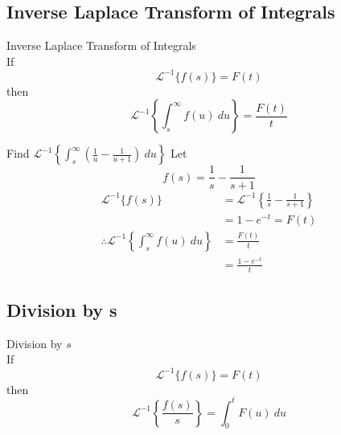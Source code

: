 \documentclass[12pt]{article}
\newcommand{\Lapinv}{\mathscr{L}^{-1}}
\begin{document}
\subsection{Inverse Laplace Transform of Integrals}

\begin{theorem}{Inverse Laplace Transform of Integrals}{}
    \\If \[
        \Lapinv \{ f(s) \} = F(t)
    \] then \[
        \Lapinv \left\{ \int_{s}^{\infty} {f(u)} \: d{u} \right\} = \frac{F(t)}{t}
    \]
\end{theorem}

\begin{example}{Find $\displaystyle \Lapinv \left\{ \int_{s}^{\infty} {\left( \frac{1}{u} - \frac{1}{u+1} \right)} \: d{u} \right\}$}{}
    Let \[
        f(s) = \frac{1}{s} - \frac{1}{s+1}
    \]
    \begin{align*}
        \Lapinv \{ f(s) \} &= \Lapinv \left\{ \frac{1}{s} - \frac{1}{s+1} \right\} \\
        &= 1 - e^{-t} = F(t) \\
        \therefore \Lapinv \left\{ \int_{s}^{\infty} {f(u)} \: d{u} \right\} &= \frac{F(t)}{t} \\
        &= \frac{1-e^{-t}}{t}
    \end{align*}
\end{example}


\subsection{Division by s}

\begin{theorem}{Division by $s$}{}
    \\If \[
        \Lapinv \{ f(s) \} = F(t)
    \] then \[
        \Lapinv \left\{ \frac{f(s)}{s} \right\} = \int_{0}^{t} {F(u)} \: d{u}
    \]
\end{theorem}
\end{document}

